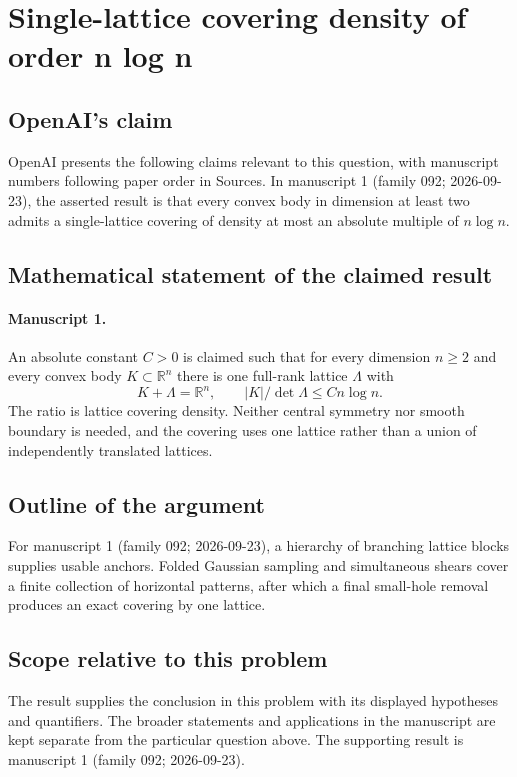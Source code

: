 \documentclass[11pt]{article}
\begin{document}
\section*{Single-lattice covering density of order n log n}

\subsection{OpenAI's claim}
OpenAI presents the following claims relevant to this question, with manuscript numbers following paper order in Sources. In manuscript 1 (family 092; 2026-09-23), the asserted result is that every convex body in dimension at least two admits a single-lattice covering of density at most an absolute multiple of $n\log n$.

\subsection{Mathematical statement of the claimed result}
\paragraph{Manuscript 1.}
An absolute constant $C>0$ is claimed such that for every dimension $n\ge2$ and every convex body $K\subset\mathbb R^n$ there is one full-rank lattice $\Lambda$ with
\[
 K+\Lambda=\mathbb R^n,\qquad |K|/\det\Lambda\le Cn\log n.
\]
The ratio is lattice covering density. Neither central symmetry nor smooth boundary is needed, and the covering uses one lattice rather than a union of independently translated lattices.

\subsection{Outline of the argument}
For manuscript 1 (family 092; 2026-09-23), a hierarchy of branching lattice blocks supplies usable anchors. Folded Gaussian sampling and simultaneous shears cover a finite collection of horizontal patterns, after which a final small-hole removal produces an exact covering by one lattice.

\subsection{Scope relative to this problem}
The result supplies the conclusion in this problem with its displayed hypotheses and quantifiers. The broader statements and applications in the manuscript are kept separate from the particular question above. The supporting result is manuscript 1 (family 092; 2026-09-23).
\end{document}
